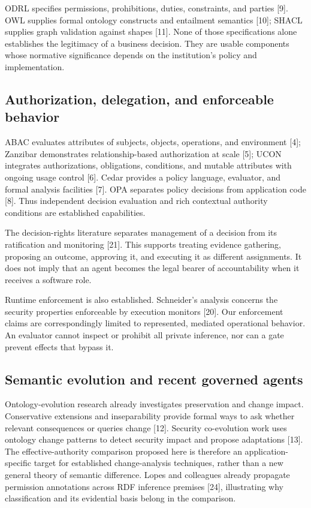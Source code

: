 \documentclass[
  english,
  12pt,
  a4paper,
  preprint,
  numbers,
  nopreprintline]{elsarticle}
\begin{document}
ODRL specifies permissions, prohibitions, duties, constraints, and
parties {[}9{]}. OWL supplies formal ontology constructs and entailment
semantics {[}10{]}; SHACL supplies graph validation against shapes
{[}11{]}. None of those specifications alone establishes the legitimacy
of a business decision. They are usable components whose normative
significance depends on the institution's policy and implementation.

\subsection{Authorization, delegation, and enforceable
behavior}\label{authorization-delegation-and-enforceable-behavior}

ABAC evaluates attributes of subjects, objects, operations, and
environment {[}4{]}; Zanzibar demonstrates relationship-based
authorization at scale {[}5{]}; UCON integrates authorizations,
obligations, conditions, and mutable attributes with ongoing usage
control {[}6{]}. Cedar provides a policy language, evaluator, and formal
analysis facilities {[}7{]}. OPA separates policy decisions from
application code {[}8{]}. Thus independent decision evaluation and rich
contextual authority conditions are established capabilities.

The decision-rights literature separates management of a decision from
its ratification and monitoring {[}21{]}. This supports treating
evidence gathering, proposing an outcome, approving it, and executing it
as different assignments. It does not imply that an agent becomes the
legal bearer of accountability when it receives a software role.

Runtime enforcement is also established. Schneider's analysis concerns
the security properties enforceable by execution monitors {[}20{]}. Our
enforcement claims are correspondingly limited to represented, mediated
operational behavior. An evaluator cannot inspect or prohibit all
private inference, nor can a gate prevent effects that bypass it.

\subsection{Semantic evolution and recent governed
agents}\label{semantic-evolution-and-recent-governed-agents}

Ontology-evolution research already investigates preservation and change
impact. Conservative extensions and inseparability provide formal ways
to ask whether relevant consequences or queries change {[}12{]}.
Security co-evolution work uses ontology change patterns to detect
security impact and propose adaptations {[}13{]}. The
effective-authority comparison proposed here is therefore an
application-specific target for established change-analysis techniques,
rather than a new general theory of semantic difference. Lopes and
colleagues already propagate permission annotations across RDF inference
premises {[}24{]}, illustrating why classification and its evidential
basis belong in the comparison.
\end{document}
